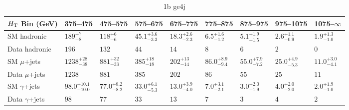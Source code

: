 \documentclass[8pt]{article}
\def\scalht{\mbox{$H_{\rm{T}}$}\xspace}
\newcommand\T{\rule{0pt}{2.6ex}}
\newcommand\B{\rule[-1.2ex]{0pt}{0pt}}
\begin{document}
\begin{table}[ht!]
\caption{1b ge4j}
\label{tab:ensemble-1b ge4j}
\centering
\begin{tabular}{ lllllllll }

\hline
\scalht Bin (GeV)       & 375--475                       & 475--575                       & 575--675                       & 675--775                       & 775--875                       & 875--975                       & 975--1075                      & 1075--$\infty$                 \\ [1.000000ex]
\hline
SM hadronic\T           & $189^{+7}_{-8}$                & $118^{+6}_{-6}$                & $45.1^{+3.6}_{-3.3}$           & $18.3^{+2.6}_{-2.3}$           & $6.5^{+1.6}_{-1.2}$            & $5.1^{+1.9}_{-1.5}$            & $2.6^{+1.1}_{-0.9}$            & $1.9^{+1.3}_{-1.0}$            \\ 
Data hadronic\B         & $196$                          & $132$                          & $44$                           & $14$                           & $8$                            & $6$                            & $2$                            & $0$                            \\ 
\hline
SM $\mu$+jets\T         & $1238^{+28}_{-38}$             & $881^{+32}_{-33}$              & $385^{+18}_{-18}$              & $202^{+13}_{-14}$              & $86.0^{+8.9}_{-9.4}$           & $55.0^{+7.9}_{-7.2}$           & $25.0^{+4.9}_{-5.3}$           & $11.0^{+3.0}_{-4.1}$           \\ 
Data $\mu$+jets\B       & $1238$                         & $881$                          & $385$                          & $202$                          & $86$                           & $55$                           & $25$                           & $11$                           \\ 
\hline
SM $\gamma$+jets\T      & $98.0^{+10.1}_{-10.0}$         & $77.0^{+8.2}_{-8.2}$           & $33.0^{+6.1}_{-5.3}$           & $13.0^{+3.9}_{-4.0}$           & $7.0^{+3.1}_{-2.1}$            & $3.0^{+2.0}_{-1.9}$            & $4.0^{+2.0}_{-2.0}$            & $2.0^{+1.9}_{-1.0}$            \\ 
Data $\gamma$+jets\B    & $98$                           & $77$                           & $33$                           & $13$                           & $7$                            & $3$                            & $4$                            & $2$                            \\ 
\hline

\end{tabular}
\end{table}
\end{document}
